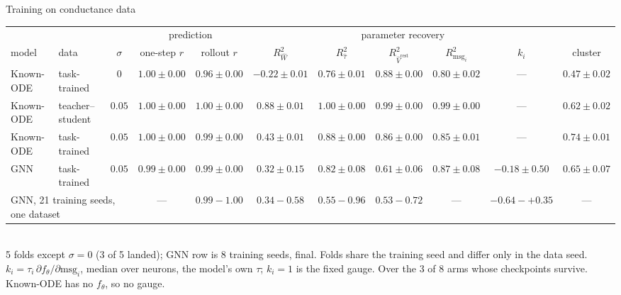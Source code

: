 \documentclass[aspectratio=169]{beamer}
\newcommand{\good}[1]{\textcolor{goodgreen}{#1}}
\newcommand{\bad}[1]{\textcolor{badred}{#1}}
\begin{document}
\begin{frame}{Training on conductance data}
\vspace*{0.35cm}
\centering\tiny
\setlength{\tabcolsep}{3pt}
\begin{tabular}{llccccccccc}
\toprule
 & & & \multicolumn{2}{c}{prediction} & \multicolumn{5}{c}{parameter recovery} & \\
\cmidrule(lr){4-5}\cmidrule(lr){6-10}
model & data & $\sigma$ & one-step $r$ & rollout $r$
  & $R^2_{\hat W}$ & $R^2_{\hat\tau}$ & $R^2_{\hat V^{\mathrm{rest}}}$
  & $R^2_{\mathrm{msg}_i}$ & $k_i$ & cluster \\
\midrule
Known-ODE & task-trained & $0$
  & \good{$1.00{\pm}0.00$} & \good{$0.96{\pm}0.00$}
  & \bad{$-0.22{\pm}0.01$} & $0.76{\pm}0.01$ & $0.88{\pm}0.00$ & $0.80{\pm}0.02$ & \multicolumn{1}{c}{---} & $0.47{\pm}0.02$ \\
\midrule
Known-ODE & teacher--student & $0.05$
  & \good{$1.00{\pm}0.00$} & \good{$1.00{\pm}0.00$}
  & \good{$0.88{\pm}0.01$} & \good{$1.00{\pm}0.00$} & \good{$0.99{\pm}0.00$} & \good{$0.99{\pm}0.00$} & \multicolumn{1}{c}{---} & $0.62{\pm}0.02$ \\
Known-ODE & task-trained & $0.05$
  & \good{$1.00{\pm}0.00$} & \good{$0.99{\pm}0.00$}
  & $\mathbf{0.43{\pm}0.01}$ & $0.88{\pm}0.00$ & $0.86{\pm}0.00$ & $0.85{\pm}0.01$ & \multicolumn{1}{c}{---} & $0.74{\pm}0.01$ \\
GNN & task-trained & $0.05$
  & \good{$0.99{\pm}0.00$} & \good{$0.99{\pm}0.00$}
  & $\mathbf{0.32{\pm}0.15}$ & $0.82{\pm}0.08$ & $0.61{\pm}0.06$ & $0.87{\pm}0.08$ & \bad{$-0.18{\pm}0.50$} & $0.65{\pm}0.07$ \\
\midrule
\multicolumn{3}{l}{GNN, 21 training seeds, one dataset}
  & \multicolumn{1}{c}{---} & \good{$0.99 - 1.00$}
  & $\mathbf{0.34 - 0.58}$ & $0.55 - 0.96$ & $0.53 - 0.72$ & \multicolumn{1}{c}{---}
  & \bad{$-0.64 - +0.35$} & \multicolumn{1}{c}{---} \\
\bottomrule
\end{tabular}\\[5pt]
{\tiny 5 folds except $\sigma = 0$ (3 of 5 landed); GNN row is 8 training seeds,
final. Folds share the training seed and differ only in the data seed.
$k_i = \tau_i\,\partial f_\theta/\partial\mathrm{msg}_i$, median over neurons, the
model's own $\tau$; $k_i = 1$ is the fixed gauge. Over the $3$ of $8$ arms whose
checkpoints survive. Known-ODE has no $f_\theta$, so no gauge.}
\end{frame}
\end{document}
